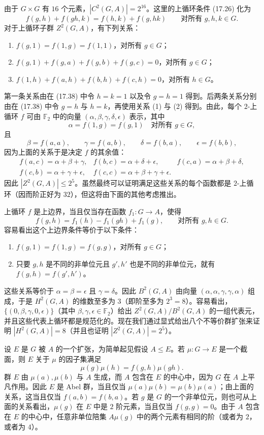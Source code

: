 由于 $G\times G$ 有 $16$ 个元素，$|C^2(G,A)|=2^{16}$。这里的上循环条件 (17.26) 化为
\[
  f(g,h)+f(gh,k)=f(h,k)+f(g,hk)
  \qquad\text{对所有 }g,h,k\in G.
  \tag{17.38}
\]
对于上循环子群 $Z^2(G,A)$，有下列关系：
\begin{enumerate}[label=(\arabic*)]
  \item $f(g,1)=f(1,g)=f(1,1)$，对所有 $g\in G$；
  \item $f(g,1)+f(g,a)+f(g,b)+f(g,c)=0$，对所有 $g\in G$；
  \item $f(1,h)+f(a,h)+f(b,h)+f(c,h)=0$，对所有 $h\in G$。
\end{enumerate}
第一条关系由在 (17.38) 中令 $h=k=1$ 以及令 $g=h=1$ 得到。后两条关系分别由在 (17.38) 中令 $g=h$ 与 $h=k$，再使用关系 (1) 与 (2) 得到。由此，每个 $2$-上循环 $f$ 可由 $\mathbb F_2$ 中的向量 $(\alpha,\beta,\gamma,\delta,\epsilon)$ 表示，其中
\[
  \alpha=f(1,g)=f(g,1)\quad\text{对所有 }g\in G,
\]
且
\[
  \beta=f(a,a),\qquad \gamma=f(a,b),\qquad \delta=f(b,a),\qquad \epsilon=f(b,b),
\]
因为上面的关系于是决定 $f$ 的其余值：
\[
\begin{array}{lll}
  f(a,c)=\alpha+\beta+\gamma, & f(b,c)=\alpha+\delta+\epsilon, & f(c,a)=\alpha+\beta+\delta,\\
  f(c,b)=\alpha+\gamma+\epsilon, & f(c,c)=\alpha+\beta+\gamma+\epsilon. &
\end{array}
\]
因此 $|Z^2(G,A)|\leq2^5$。虽然最终可以证明满足这些关系的每个函数都是 $2$-上循环（因而阶正好为 $32$），但这将由下面的其他考虑推出。

上循环 $f$ 是上边界，当且仅当存在函数 $f_1:G\to A$，使得
\[
  f(g,h)=f_1(h)-f_1(gh)+f_1(g),
  \qquad\text{对所有 }g,h\in G.
\]
容易看出这个上边界条件等价于以下条件：
\begin{enumerate}[label=(\roman*)]
  \item $f(g,1)=f(1,g)=f(g,g)$，对所有 $g\in G$；
  \item 只要 $g,h$ 是不同的非单位元且 $g',h'$ 也是不同的非单位元，就有 $f(g,h)=f(g',h')$。
\end{enumerate}
这些关系等价于 $\alpha=\beta=\epsilon$ 且 $\gamma=\delta$。因此 $B^2(G,A)$ 由向量 $(\alpha,\alpha,\gamma,\gamma,\alpha)$ 组成，于是 $H^2(G,A)$ 的维数至多为 $3$（即阶至多为 $2^3=8$）。容易看出，$\{(0,\beta,\gamma,0,\epsilon)\}$（其中 $\beta,\gamma,\epsilon\in\mathbb F_2$）给出 $Z^2(G,A)/B^2(G,A)$ 的一组代表元，并且这些代表上循环都是规范化的。现在我们通过显式给出八个不等价群扩张来证明 $|H^2(G,A)|=8$（并且也证明 $|Z^2(G,A)|=2^5$）。

设 $E$ 是 $G$ 被 $A$ 的一个扩张，为简单起见假设 $A\leq E$。若 $\mu:G\to E$ 是一个截面，则 $E$ 关于 $\mu$ 的因子集满足
\[
  \mu(g)\mu(h)=f(g,h)\mu(gh).
\]
群 $E$ 由 $\mu(a),\mu(b)$ 与 $A$ 生成，而 $A$ 包含在 $E$ 的中心中，因为 $G$ 在 $A$ 上平凡作用。因此 $E$ 是 Abel 群，当且仅当 $\mu(a)\mu(b)=\mu(b)\mu(a)$；由上面的关系，这当且仅当 $f(a,b)=f(b,a)$。若 $g$ 是 $G$ 的一个非单位元，则也可从上面的关系看出，$\mu(g)$ 在 $E$ 中是 $2$ 阶元素，当且仅当 $f(g,g)=0$。由于 $A$ 包含在 $E$ 的中心中，任意非单位陪集 $A\mu(g)$ 中的两个元素有相同的阶（或者为 $2$，或者为 $4$）。


